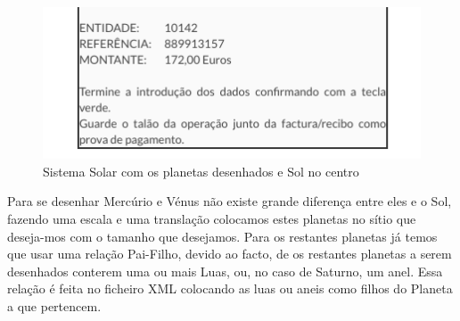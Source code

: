 \begin{figure}[htpb]
	\centering
	\includegraphics[scale=0.5]{sistemasolar.png}
	\caption{Sistema Solar com os planetas desenhados e Sol no centro}
	\label{p1:fig:p1_sistemasolar}
\end{figure}




Para se desenhar Mercúrio e Vénus não existe grande diferença entre eles e o Sol, fazendo uma escala e uma translação colocamos estes planetas no sítio que deseja-mos com o tamanho que desejamos. Para os restantes planetas já temos que usar uma relação Pai-Filho, devido ao facto, de os restantes planetas a serem desenhados conterem uma ou mais Luas, ou, no caso de Saturno, um anel. Essa relação é feita no ficheiro XML colocando as luas ou aneis como filhos do Planeta a que pertencem. 






